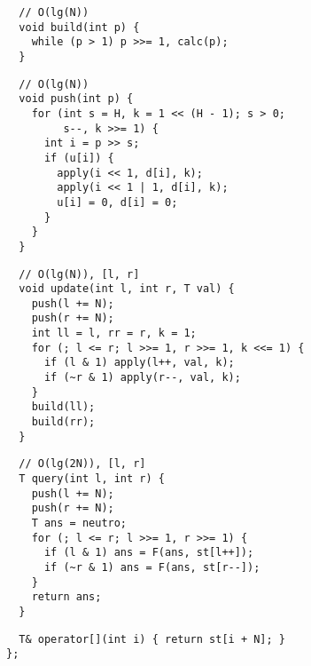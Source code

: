\documentclass[twoside]{article}
\begin{document}
\begin{multicols*}{2}
\vspace{-12pt}
\begin{verbatim}
  // O(lg(N))
  void build(int p) {
    while (p > 1) p >>= 1, calc(p);
  }
\end{verbatim}
\vspace{-12pt}
\begin{verbatim}
  // O(lg(N))
  void push(int p) {
    for (int s = H, k = 1 << (H - 1); s > 0;
         s--, k >>= 1) {
      int i = p >> s;
      if (u[i]) {
        apply(i << 1, d[i], k);
        apply(i << 1 | 1, d[i], k);
        u[i] = 0, d[i] = 0;
      }
    }
  }
\end{verbatim}
\vspace{-12pt}
\begin{verbatim}
  // O(lg(N)), [l, r]
  void update(int l, int r, T val) {
    push(l += N);
    push(r += N);
    int ll = l, rr = r, k = 1;
    for (; l <= r; l >>= 1, r >>= 1, k <<= 1) {
      if (l & 1) apply(l++, val, k);
      if (~r & 1) apply(r--, val, k);
    }
    build(ll);
    build(rr);
  }
\end{verbatim}
\vspace{-12pt}
\begin{verbatim}
  // O(lg(2N)), [l, r]
  T query(int l, int r) {
    push(l += N);
    push(r += N);
    T ans = neutro;
    for (; l <= r; l >>= 1, r >>= 1) {
      if (l & 1) ans = F(ans, st[l++]);
      if (~r & 1) ans = F(ans, st[r--]);
    }
    return ans;
  }
\end{verbatim}
\vspace{-12pt}
\begin{verbatim}
  T& operator[](int i) { return st[i + N]; }
};
\end{verbatim}

\subsubsectionfont{\large\bfseries\sffamily\underline}

\end{multicols*}
\end{document}

